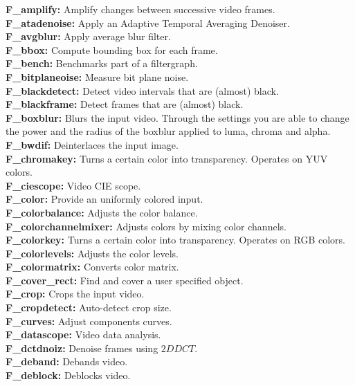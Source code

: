 \noindent \textbf{F\_amplify:} Amplify changes between successive video frames.\\
\textbf{F\_atadenoise:} Apply an Adaptive Temporal Averaging Denoiser.\\
\textbf{F\_avgblur:} Apply average blur filter.\\
\textbf{F\_bbox:} Compute bounding box for each frame.\\
\textbf{F\_bench:} Benchmarks part of a filtergraph.\\
\textbf{F\_bitplaneoise:} Measure bit plane noise.\\
\textbf{F\_blackdetect:} Detect video intervals that are (almost) black.\\
\textbf{F\_blackframe:} Detect frames that are (almost) black.\\
\textbf{F\_boxblur:} Blurs the input video. Through the settings you are able to change the power and the radius of the boxblur applied to luma, chroma and alpha.\\
\textbf{F\_bwdif:} Deinterlaces the input image.\\
\textbf{F\_chromakey:} Turns a certain color into transparency. Operates on YUV colors.\\
\textbf{F\_ciescope:} Video CIE scope.\\
\textbf{F\_color:} Provide an uniformly colored input.\\
\textbf{F\_colorbalance:} Adjusts the color balance.\\
\textbf{F\_colorchannelmixer:} Adjusts colors by mixing color channels.\\
\textbf{F\_colorkey:} Turns a certain color into transparency. Operates on RGB colors.\\
\textbf{F\_colorlevels:} Adjusts the color levels.\\
\textbf{F\_colormatrix:} Converts color matrix.\\
\textbf{F\_cover\_rect:} Find and cover a user specified object.\\
\textbf{F\_crop:} Crops the input video.\\
\textbf{F\_cropdetect:} Auto-detect crop size.\\
\textbf{F\_curves:} Adjust components curves.\\
\textbf{F\_datascope:} Video data analysis.\\
\textbf{F\_dctdnoiz:} Denoise frames using $2D DCT$.\\
\textbf{F\_deband:} Debands video.\\
\textbf{F\_deblock:} Deblocks video.\\
